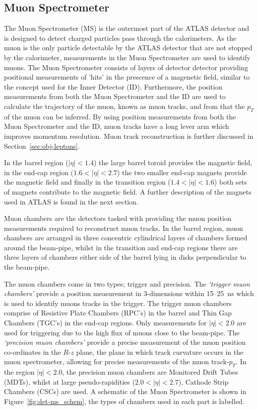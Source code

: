\subsection{Muon Spectrometer}
\label{sec:det-MS}

The Muon Spectrometer (MS) is the outermost part of the ATLAS detector and is designed to detect charged particles pass through the calorimeters.
As the muon is the only particle detectable by the ATLAS detector that are not stopped by the calorimeter,
measurements in the Muon Spectrometer are used to identify muons.
The Muon Spectrometer consists of layers of detector detector providing positional measurements of 'hits'
in the prescence of a magenetic field, similar to the concept used for the Inner Detector (ID).
Furthermore, the position measurements from both the Muon Spectrometer and the ID are used to calculate the trajectory of the muon,
known as muon tracks, and from that the $p_T$ of the muon can be inferred.
By using position measurements from both the Muon Spectrometer and the ID, muon tracks have a long lever arm which improves momentum resolution.
Muon track reconstruction is further discussed in Section~\ref{sec:obj-leptons}.

In the barrel region ($|\eta| < 1.4$) the large barrel toroid provides the magnetic field,
in the end-cap region ($1.6 < |\eta| < 2.7$) the two smaller end-cap magnets  provide the magnetic field
and finally in the transition region ($1.4 < |\eta| < 1.6$) both sets of magnets contribute to the magnetic field.
A further description of the magnets used in ATLAS is found in the next section. 

Muon chambers are the detectors tasked with providing the muon position measurements required to reconstruct muon tracks.
In the barrel region,  muon chambers are arranged in three concentric cylindrical layers of chambers formed around the beam-pipe,
whilst in the transition and end-cap regions there are three layers of chambers either side of the barrel lying in disks perpendicular to the beam-pipe.

The muon chambers come in two types; trigger and precision.
The \textit{`trigger muon chambers'} provide a position measurement in 3-dimensions within 15--\SI{25}{\nano\second} which is used to identify muons tracks in the trigger.
The trigger muon chambers comprise of Resistive Plate Chambers (RPC’s) in the barrel 
and Thin Gap Chambers (TGC’s) in the end-cap regions.
Only measurements for $|\eta| < 2.0$ are used for triggering due to the high flux of muons close to the beam-pipe.
The \textit{`precision muon chambers'} provide a precise measurement of the muon position co-ordinates in the $R$-$z$ plane,
the plane in which track curvature occurs in the muon spectrometer, allowing for precise measurements of the muon track-$p_T$. 
In the region $|\eta| < 2.0$, the precision muon chambers are Monitored Drift Tubes (MDTs),
whilst at large pseudo-rapidities ($2.0 < |\eta| < 2.7$), Cathode Strip Chambers (CSCs) are used.
A schematic of the Muon Spectrometer is shown in Figure~\ref{fig:det-ms_schem}, the types of chambers used in each part is labelled.

